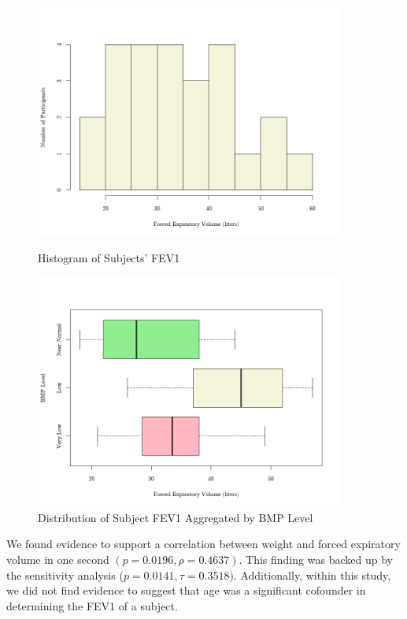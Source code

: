 \documentclass{article}
\begin{document}
		\begin{figure}[h!]
			\centering
			\tiny
			\begin{minipage}{0.46\textwidth}
			  \centering
			  \tiny
			  \includegraphics[width=0.9\textwidth]{graph2/HistFEV.png}
			  \caption{Histogram of Subjects' FEV1}
			  \label{fig:histogram}
			\end{minipage}\hfill
			\begin{minipage}{0.46\textwidth}
			  \centering
			  \tiny
			  \includegraphics[width=0.9\textwidth]{graph2/BoxFEV.png}
			  \caption{Distribution of Subject FEV1 Aggregated by BMP Level}
			  \label{fig:boxplots}
			\end{minipage}
		\end{figure}

		We found evidence to support a correlation between weight and forced expiratory volume in one second $(p = 0.0196, \rho = 0.4637)$. This finding was backed up by the sensitivity analysis ($p = 0.0141, \tau = 0.3518)$. Additionally, within this study, we did not find evidence to suggest that age was a significant cofounder in determining the FEV1 of a subject.
\end{document}
